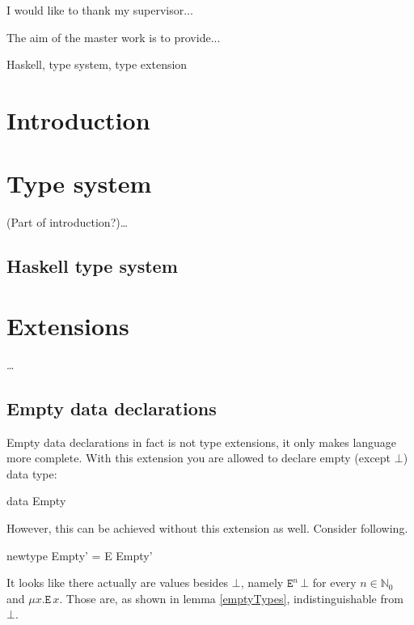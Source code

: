 \documentclass[11pt,oneside,draft]{fithesis2}
\begin{document}
\FrontMatter
\ThesisTitlePage

\begin{ThesisDeclaration}
\DeclarationText
\AdvisorName
\end{ThesisDeclaration}

\begin{ThesisThanks}
I would like to thank my supervisor...
\end{ThesisThanks}

\begin{ThesisAbstract}
The aim of the master work is to provide...
\end{ThesisAbstract}

\begin{ThesisKeyWords}
Haskell, type system, type extension
\end{ThesisKeyWords}

\tableofcontents

\MainMatter

\chapter{Introduction}

\cite{barendregt:1992:lambda, libor}

\chapter{Type system}

(Part of introduction?)\dots

\section{Haskell type system}

\cite{haskell2010}

\chapter{Extensions}

\dots

\section{Empty data declarations}

Empty data declarations in fact is not type extensions, it only makes language more complete.
With this extension you are allowed to declare empty (except \(\bot\)) data type:
\begin{code}
data Empty
\end{code}
However, this can be achieved without this extension as well. Consider following.
\begin{code}
newtype Empty' = E Empty'
\end{code}
It looks like there actually are values besides \(\bot\), namely \(\texttt{E}^n \, \bot\)
for every \(n \in \mathbb{N}_0\) and \(\mu x . \texttt{E} \, x\).
Those are, as shown in lemma \ref{emptyTypes}, indistinguishable from \(\bot\).
\end{document}
